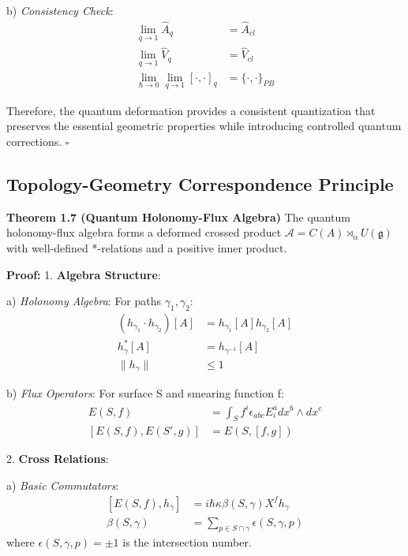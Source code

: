 \documentclass[12pt,a4paper]{article}
\begin{document}
   b) \textit{Consistency Check}:
      \[
      \begin{aligned}
      \lim_{q \to 1}\hat{A}_q &= \hat{A}_{cl} \\
      \lim_{q \to 1}\hat{V}_q &= \hat{V}_{cl} \\
      \lim_{\hbar \to 0}\lim_{q \to 1}[\cdot,\cdot]_q &= \{\cdot,\cdot\}_{PB}
      \end{aligned}
      \]

Therefore, the quantum deformation provides a consistent quantization that preserves the essential geometric properties while introducing controlled quantum corrections. $\square$

\subsection{Topology-Geometry Correspondence Principle}

\textbf{Theorem 1.7 (Quantum Holonomy-Flux Algebra)}
The quantum holonomy-flux algebra forms a deformed crossed product $\mathcal{A} = C(A) \rtimes_\alpha U(\mathfrak{g})$ with well-defined *-relations and a positive inner product.

\textbf{Proof:}
1. \textbf{Algebra Structure}:
   
   a) \textit{Holonomy Algebra}:
      For paths $\gamma_1, \gamma_2$:
      \[
      \begin{aligned}
      (h_{\gamma_1} \cdot h_{\gamma_2})[A] &= h_{\gamma_1}[A]h_{\gamma_2}[A] \\
      h_{\gamma}^*[A] &= h_{\gamma^{-1}}[A] \\
      \|h_{\gamma}\| &\leq 1
      \end{aligned}
      \]
   
   b) \textit{Flux Operators}:
      For surface S and smearing function f:
      \[
      \begin{aligned}
      E(S,f) &= \int_S f^i\epsilon_{abc}E^a_idx^b\wedge dx^c \\
      [E(S,f), E(S',g)] &= E(S,[f,g])
      \end{aligned}
      \]

2. \textbf{Cross Relations}:
   
   a) \textit{Basic Commutators}:
      \[
      \begin{aligned}
      [E(S,f), h_\gamma] &= i\hbar\kappa\beta(S,\gamma)X^f h_\gamma \\
      \beta(S,\gamma) &= \sum_{p \in S \cap \gamma} \epsilon(S,\gamma,p)
      \end{aligned}
      \]
      where $\epsilon(S,\gamma,p) = \pm1$ is the intersection number.
   
\end{document}
